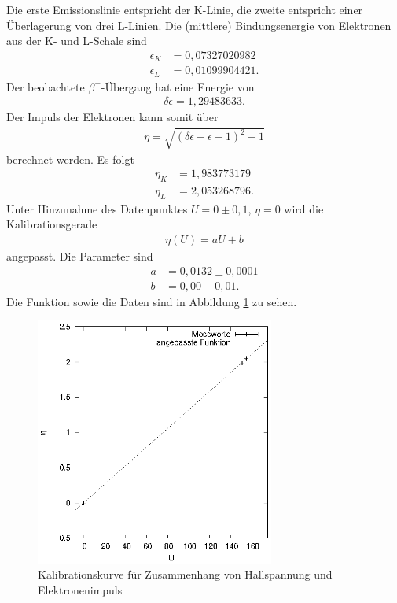 Die erste Emissionslinie entspricht der K-Linie, die zweite entspricht einer Überlagerung von drei L-Linien. Die (mittlere) Bindungsenergie von Elektronen aus der K- und L-Schale sind
\begin{align*}
  \epsilon_K&=0,07327020982\\
  \epsilon_L&=0,01099904421.
\end{align*} 
Der beobachtete $\beta^-$-Übergang hat eine Energie von
\begin{align*}
  \delta\epsilon=1,29483633.
\end{align*}
Der Impuls der Elektronen kann somit über 
\begin{align*}
  \eta=\sqrt{(\delta\epsilon-\epsilon+1)^2-1}
\end{align*}
 berechnet werden. Es folgt
\begin{align*}
  \eta_K&=1,983773179\\
  \eta_L&=2,053268796.
\end{align*}
Unter Hinzunahme des Datenpunktes $U=0 \pm 0,1$, $\eta=0$ wird die Kalibrationsgerade 
\begin{align*}
  \eta(U)=aU+b
\end{align*}
angepasst. Die Parameter sind
\begin{align*}
  a&=0,0132 \pm 0,0001\\
  b&=0,00 \pm 0,01.
\end{align*}
Die Funktion sowie die Daten sind in Abbildung \ref{fig:kal} zu sehen.
\begin{figure}[h]
  \centering
  \includegraphics[width=0.7\textwidth]{data/kal.eps}
  \caption{Kalibrationskurve für Zusammenhang von Hallspannung und Elektronenimpuls}
  \label{fig:kal}
\end{figure}

